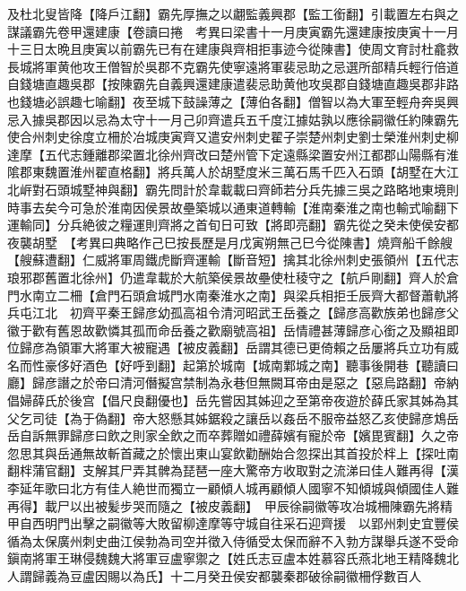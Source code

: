 及杜北叟皆降【降戶江翻】霸先厚撫之以翽監義興郡【監工銜翻】引載置左右與之謀議霸先卷甲還建康【卷讀曰捲　考異曰梁書十一月庚寅霸先還建康按庚寅十一月十三日太晩且庚寅以前霸先已有在建康與齊相拒事迹今從陳書】使周文育討杜龕救長城將軍黄他攻王僧智於吳郡不克霸先使寧遠將軍裴忌助之忌選所部精兵輕行倍道自錢塘直趣吳郡【按陳霸先自義興還建康遣裴忌助黄他攻吳郡自錢塘直趣吳郡非路也錢塘必誤趣七喻翻】夜至城下鼓譟薄之【薄伯各翻】僧智以為大軍至輕舟奔吳興忌入據吳郡因以忌為太守十一月己卯齊遣兵五千度江據姑孰以應徐嗣徽任約陳霸先使合州刺史徐度立柵於冶城庚寅齊又遣安州刺史翟子崇楚州刺史劉士榮淮州刺史柳達摩【五代志鍾離郡梁置北徐州齊改曰楚州管下定遠縣梁置安州江都郡山陽縣有淮隂郡東魏置淮州翟直格翻】將兵萬人於胡墅度米三萬石馬千匹入石頭【胡墅在大江北㟁對石頭城墅神與翻】霸先問計於韋載載曰齊師若分兵先據三吳之路略地東境則時事去矣今可急於淮南因侯景故壘築城以通東道轉輸【淮南秦淮之南也輸式喻翻下運輸同】分兵絶彼之糧運則齊將之首旬日可致【將即亮翻】霸先從之癸未使侯安都夜襲胡墅　【考異曰典略作己巳按長歷是月戊寅朔無己巳今從陳書】燒齊船千餘艘【艘蘇遭翻】仁威將軍周鐵虎斷齊運輸【斷音短】擒其北徐州刺史張領州【五代志琅邪郡舊置北徐州】仍遣韋載於大航築侯景故壘使杜稜守之【航戶剛翻】齊人於倉門水南立二柵【倉門石頭倉城門水南秦淮水之南】與梁兵相拒壬辰齊大都督蕭軌將兵屯江北　初齊平秦王歸彦幼孤高祖令清河昭武王岳養之【歸彦高歡族弟也歸彦父徽于歡有舊恩故歡憐其孤而命岳養之歡廟號高祖】岳情禮甚薄歸彦心銜之及顯祖即位歸彦為領軍大將軍大被寵遇【被皮義翻】岳謂其德已更倚賴之岳屢將兵立功有威名而性豪侈好酒色【好呼到翻】起第於城南【城南鄴城之南】聽事後開巷【聽讀曰廳】歸彦譖之於帝曰清河僭擬宫禁制為永巷但無闕耳帝由是惡之【惡烏路翻】帝納倡婦薛氏於後宫【倡尺良翻優也】岳先嘗因其姊迎之至第帝夜遊於薛氏家其姊為其父乞司徒【為于偽翻】帝大怒懸其姊鋸殺之讓岳以姦岳不服帝益怒乙亥使歸彦鴆岳岳自訴無罪歸彦曰飲之則家全飲之而卒葬贈如禮薛嬪有寵於帝【嬪毘賓翻】久之帝忽思其與岳通無故斬首藏之於懷出東山宴飲勸酬始合忽探出其首投於柈上【探吐南翻柈蒲官翻】支解其尸弄其髀為琵琶一座大驚帝方收取對之流涕曰佳人難再得【漢李延年歌曰北方有佳人絶世而獨立一顧傾人城再顧傾人國寧不知傾城與傾國佳人難再得】載尸以出被髪步哭而隨之【被皮義翻】　甲辰徐嗣徽等攻冶城柵陳霸先將精甲自西明門出擊之嗣徽等大敗留柳達摩等守城自往采石迎齊援　以郢州刺史宜豐侯循為太保廣州刺史曲江侯勃為司空并徵入侍循受太保而辭不入勃方謀舉兵遂不受命　鎭南將軍王琳侵魏魏大將軍豆盧寧禦之【姓氏志豆盧本姓慕容氏燕北地王精降魏北人謂歸義為豆盧因賜以為氏】十二月癸丑侯安都襲秦郡破徐嗣徽柵俘數百人

